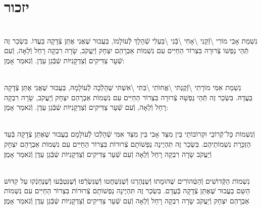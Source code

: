 \documentclass[twoside, openany, parskip=half, 11pt]{book}
\begin{document}
\vfill
{}


\sepline



\chapter[יזכור]{ יזכור }

 

\\
נִשְׁמַת אָבִי מוֹרִי \textbackslash זְֿקֵנִי \textbackslash אָחִי \textbackslash בְּֿנִי \textbackslash בַּעְלִי  שְֿׁהָלַךְ לְֿעוֹלָמוֹ, בַּעֲבוּר שֶׁאֲנִי אֶתֵּן צְֿדָקָה בַּעֲדוֹ. בִּשְׂכַר זֶה תְּֿהֵי נַפְשׁוֹ צְֿרוּרָה בִּצְרוֹר הַחַיִּים עִם נִשְׁמוֹת אַבְרָהַם יִצְחָק וְֿיַעֲקֹב, שָׂרָה רִבְקָה רָחֵל וְֿלֵאָה, וְֿעִם שְֿׁעָר צַדִּיקִים וְֿצַדְקָנִיּוֹת שְֿבְּֿגַן עֵדֶן. וְֿנֹאמַר אָמֶן:

\\
נִשְׁמַת אִמִּי מוֹרָתִי \textbackslash זְֿקֶנְתּי \textbackslash אֲחוׂתִי \textbackslash בִּתִּי \textbackslash אִשְׁתּי
שֶׁהָלְֿכָה לְֿעוֹלָמָהּ, בַּעֲבוּר שֶׁאֲנִי אֶתֵּן צְֿדָקָה בַּעֲדָהּ. בִּשְׂכַר זֶה תְּֿהֵי נַפְשָׁהּ צְֿרוּרָה בִּצְרוֹר הַחַיִּים עִם נִשְׁמוֹת אַבְרָהַם יִצְחָק וְֿיַעֲקֹב, שָׂרָה רִבְקָה רָחֵל וְֿלֵאָה, וְֿעִם שְֿׁעָר צַדִּיקִים וְֿצַדְקָנִיּוֹת שְֿבְּֿגַן עֵדֶן. וְֿנֹאמַר אָמֶן:

 \\
וְֿנִשְׁמוֹת כָּל־קְֿרוֹבַי וּקְרוֹבוֹתַי בֵּין מִצַּד אָבִי בֵּין מִצַּד אִמִּי
שְֿׁהָלְֿכוּ לְֿעוׂלָמָם
בַעֲבוּר שֶׁאֶתֵּן צְֿדָקָה בְּֿעַד הַזְכָּרַת נִשְׁמוֹתֵיהֶם. בִּשְׂכַר זֶה תִּהְיֶינָה נַפְשׁוֹתָם צְֿרוּרוֹת בִּצְרוֹר הַחַיִּים עִם נִשְׁמוֹת אַבְרָהַם יִצְחָק וְֿיַעֲקֹב שָׂרָה רִבְקָה רָחֵל וְֿלֵאָה וְֿעִם שְֿׁעָר צַדִּיקִים וְֿצַדְקָנִיּוֹת שְֿבְּֿגַן עֵדֶן וְֿנֹאמַר אָמֶן׃



\\
נִשְׁמוׂת הַקְּֿדוׂשִׁים וְֿהַטְּֿהוׂרִים
שֶׁהוּמָתוּ וְֿשֶנֶּהֶרְגוּ וְֿשֶׁנִּשְׁחֲטוּ וְֿשֶׁנִּשְׂרְֿפוּ וְֿשֶׁנִּטְבְּֿעוּ וְֿשֶׁנֶּחְנְֿקוּ עַל קִדּוּשׁ הַשֵּם בַעֲבוּר שֶׁאֶתֵּן צְֿדָקָה בְּֿעֲדָם. בִּשְׂכַר זֶה תִּהְיֶינָה נַפְשׁוֹתָם צְֿרוּרוֹת בִּצְרוֹר הַחַיִּים עִם נִשְׁמוֹת אַבְרָהַם יִצְחָק וְֿיַעֲקֹב שָׂרָה רִבְקָה רָחֵל וְֿלֵאָה וְֿעִם שְֿׁעָר צַדִּיקִים וְֿצַדְקָנִיּוֹת שְֿבְּֿגַן עֵדֶן וְֿנֹאמַר אָמֶן׃
\end{document}
